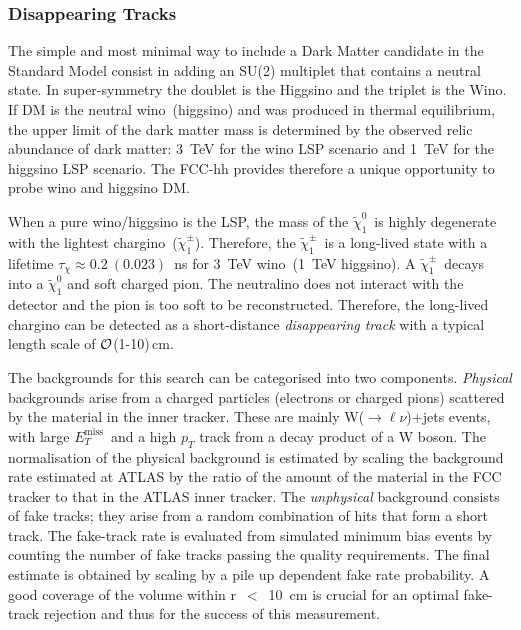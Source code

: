 \documentclass[11pt,twoside,a4paper]{cernrep}
\begin{document}
\subsubsection{Disappearing Tracks}
The simple and most minimal way to include a Dark Matter candidate in the Standard Model consist in adding an SU(2) multiplet that contains a neutral state. In super-symmetry the doublet is the Higgsino and the triplet is the Wino. If DM is the neutral wino~(higgsino) and was produced in thermal equilibrium, the upper limit of the dark matter mass is determined by the observed relic abundance of dark matter: 3~TeV for the wino LSP scenario and 1~TeV for the higgsino LSP scenario. The FCC-hh provides therefore a unique opportunity to probe wino and higgsino DM.

When a pure wino/higgsino is the LSP, the mass of the \ensuremath{\tilde{\chi}_{1}^{0}}~is highly degenerate with the lightest chargino~(\ensuremath{\tilde{\chi}_{1}^{\pm}}).
Therefore, the \ensuremath{\tilde{\chi}_{1}^{\pm}}~is a long-lived state with a lifetime $\tau_{\chi}\approx 0.2~(0.023)$~ns for 3~TeV wino~(1~TeV higgsino).
A \ensuremath{\tilde{\chi}_{1}^{\pm}}~decays into a \ensuremath{\tilde{\chi}_{1}^{0}} and soft charged pion. The neutralino does not interact with the detector and the pion is too soft to be reconstructed. Therefore, the long-lived chargino can be detected as a short-distance \emph{disappearing track} with a typical length scale of $\cal{O}$(1-10)\,cm.


The backgrounds for this search can be categorised into two components.
\emph{Physical} backgrounds arise from a charged particles (electrons or charged pions) scattered by the material in the inner tracker. These are mainly W($\rightarrow \ell\nu$)+jets events, with large $E_T^{\mathrm{miss}}$~and a high $p_{T}$ track from a decay product of a W boson. The normalisation of the physical background is estimated by scaling the background rate estimated at ATLAS by the ratio of the amount of the material in the FCC tracker to that in the ATLAS inner tracker. The \emph{unphysical} background consists of fake tracks; they arise from a random combination of hits that form a short track. The fake-track rate is evaluated from simulated minimum bias events by counting the number of fake tracks passing the quality requirements. The final estimate is obtained by scaling by a pile up dependent fake rate probability. A good coverage of the volume within r~$<$~10~cm is crucial for an optimal fake-track rejection and thus for the success of this measurement.
\end{document}
